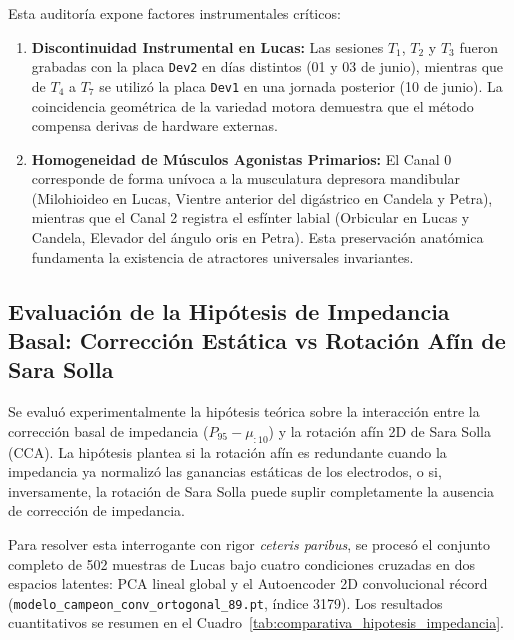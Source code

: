 \documentclass[11pt,a4paper,openany]{book}
\theoremstyle{definition}
\begin{document}
Esta auditoría expone factores instrumentales críticos:
\begin{enumerate}
    \item \textbf{Discontinuidad Instrumental en Lucas:} Las sesiones $T_1$, $T_2$ y $T_3$ fueron grabadas con la placa \texttt{Dev2} en días distintos (01 y 03 de junio), mientras que de $T_4$ a $T_7$ se utilizó la placa \texttt{Dev1} en una jornada posterior (10 de junio). La coincidencia geométrica de la variedad motora demuestra que el método compensa derivas de hardware externas.
    \item \textbf{Homogeneidad de Músculos Agonistas Primarios:} El Canal 0 corresponde de forma unívoca a la musculatura depresora mandibular (Milohioideo en Lucas, Vientre anterior del digástrico en Candela y Petra), mientras que el Canal 2 registra el esfínter labial (Orbicular en Lucas y Candela, Elevador del ángulo oris en Petra). Esta preservación anatómica fundamenta la existencia de atractores universales invariantes.
\end{enumerate}

\subsection{Evaluación de la Hipótesis de Impedancia Basal: Corrección Estática vs Rotación Afín de Sara Solla}
\label{subsec:evaluacion_hipotesis_impedancia}

Se evaluó experimentalmente la hipótesis teórica sobre la interacción entre la corrección basal de impedancia ($P_{95} - \mu_{:10}$) y la rotación afín 2D de Sara Solla (CCA). La hipótesis plantea si la rotación afín es redundante cuando la impedancia ya normalizó las ganancias estáticas de los electrodos, o si, inversamente, la rotación de Sara Solla puede suplir completamente la ausencia de corrección de impedancia.

Para resolver esta interrogante con rigor \textit{ceteris paribus}, se procesó el conjunto completo de 502 muestras de Lucas bajo cuatro condiciones cruzadas en dos espacios latentes: PCA lineal global y el Autoencoder 2D convolucional récord (\texttt{modelo\_campeon\_conv\_ortogonal\_89.pt}, índice 3179). Los resultados cuantitativos se resumen en el Cuadro~\ref{tab:comparativa_hipotesis_impedancia}.
\end{document}
